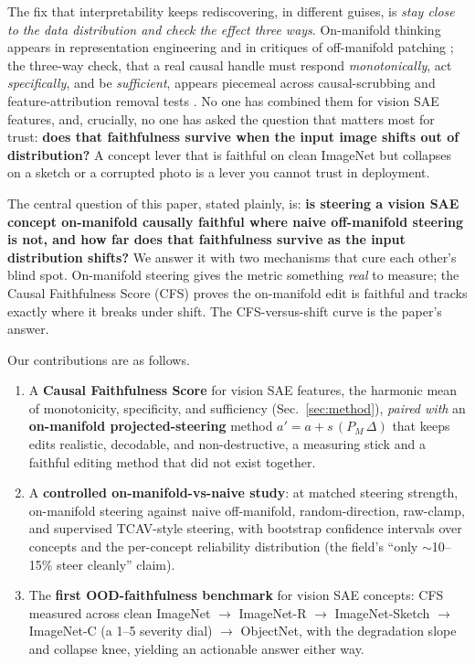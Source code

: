 \documentclass[conference]{IEEEtran}
\begin{document}
The fix that interpretability keeps rediscovering, in different guises, is \emph{stay close to the data distribution and check the effect three ways}. On-manifold thinking appears in representation engineering and in critiques of off-manifold patching \cite{zou2023repe,makelov2024principled}; the three-way check, that a real causal handle must respond \emph{monotonically}, act \emph{specifically}, and be \emph{sufficient}, appears piecemeal across causal-scrubbing \cite{chan2022scrubbing} and feature-attribution removal tests \cite{hooker2018roar}. No one has combined them for vision SAE features, and, crucially, no one has asked the question that matters most for trust: \textbf{does that faithfulness survive when the input image shifts out of distribution?} A concept lever that is faithful on clean ImageNet but collapses on a sketch or a corrupted photo is a lever you cannot trust in deployment.

The central question of this paper, stated plainly, is: \textbf{is steering a vision SAE concept on-manifold causally faithful where naive off-manifold steering is not, and how far does that faithfulness survive as the input distribution shifts?} We answer it with two mechanisms that cure each other's blind spot. On-manifold steering gives the metric something \emph{real} to measure; the Causal Faithfulness Score (CFS) proves the on-manifold edit is faithful and tracks exactly where it breaks under shift. The CFS-versus-shift curve is the paper's answer.

Our contributions are as follows.
\begin{enumerate}
\item A \textbf{Causal Faithfulness Score} for vision SAE features, the harmonic mean of monotonicity, specificity, and sufficiency (Sec.~\ref{sec:method}), \emph{paired with} an \textbf{on-manifold projected-steering} method $a' = a + s\,(P_M\,\Delta)$ that keeps edits realistic, decodable, and non-destructive, a measuring stick and a faithful editing method that did not exist together.
\item A \textbf{controlled on-manifold-vs-naive study}: at matched steering strength, on-manifold steering against naive off-manifold, random-direction, raw-clamp, and supervised TCAV-style steering, with bootstrap confidence intervals over concepts and the per-concept reliability distribution (the field's ``only $\sim$10--15\% steer cleanly'' claim).
\item The \textbf{first OOD-faithfulness benchmark} for vision SAE concepts: CFS measured across clean ImageNet $\rightarrow$ ImageNet-R $\rightarrow$ ImageNet-Sketch $\rightarrow$ ImageNet-C (a 1--5 severity dial) $\rightarrow$ ObjectNet, with the degradation slope and collapse knee, yielding an actionable answer either way.
\end{enumerate}
\end{document}
